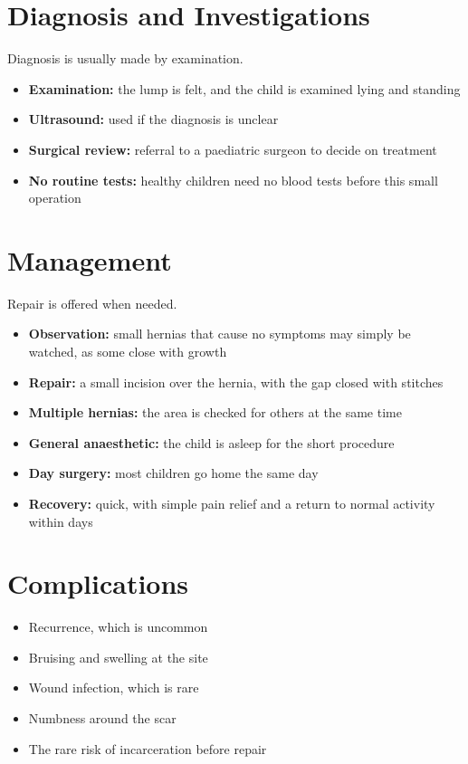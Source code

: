 \section*{Diagnosis and Investigations}
Diagnosis is usually made by examination.
\begin{itemize}
    \item \textbf{Examination:} the lump is felt, and the child is examined lying and standing
    \item \textbf{Ultrasound:} used if the diagnosis is unclear
    \item \textbf{Surgical review:} referral to a paediatric surgeon to decide on treatment
    \item \textbf{No routine tests:} healthy children need no blood tests before this small operation
\end{itemize}

\section*{Management}
Repair is offered when needed.
\begin{itemize}
    \item \textbf{Observation:} small hernias that cause no symptoms may simply be watched, as some close with growth
    \item \textbf{Repair:} a small incision over the hernia, with the gap closed with stitches
    \item \textbf{Multiple hernias:} the area is checked for others at the same time
    \item \textbf{General anaesthetic:} the child is asleep for the short procedure
    \item \textbf{Day surgery:} most children go home the same day
    \item \textbf{Recovery:} quick, with simple pain relief and a return to normal activity within days
\end{itemize}

\section*{Complications}
\begin{itemize}
    \item Recurrence, which is uncommon
    \item Bruising and swelling at the site
    \item Wound infection, which is rare
    \item Numbness around the scar
    \item The rare risk of incarceration before repair
\end{itemize}

